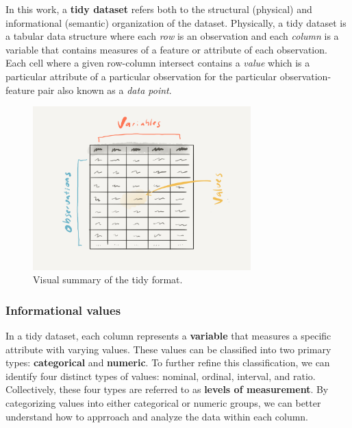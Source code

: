 \documentclass[
  letterpaper,
]{latex/krantz}
\begin{document}
In this work, a \textbf{tidy dataset} refers both to the structural
(physical) and informational (semantic) organization of the dataset.
Physically, a tidy dataset is a tabular data structure where each
\emph{row} is an observation and each \emph{column} is a variable that
contains measures of a feature or attribute of each observation. Each
cell where a given row-column intersect contains a \emph{value} which is
a particular attribute of a particular observation for the particular
observation-feature pair also known as a \emph{data point}.

\begin{figure}[h]

{\centering \includegraphics[width=0.75\textwidth,height=\textheight]{figures/understanding-data/tidy-format-paper.png}

}

\caption{\label{fig-tidy-format-image}Visual summary of the tidy
format.}

\end{figure}

\hypertarget{ud-informational-values}{%
\subsubsection{Informational values}\label{ud-informational-values}}

In a tidy dataset, each column represents a \textbf{variable} that
measures a specific attribute with varying values. These values can be
classified into two primary types: \textbf{categorical} and
\textbf{numeric}. To further refine this classification, we can identify
four distinct types of values: nominal, ordinal, interval, and ratio.
Collectively, these four types are referred to as \textbf{levels of
measurement}. By categorizing values into either categorical or numeric
groups, we can better understand how to apprroach and analyze the data
within each column.
\end{document}
